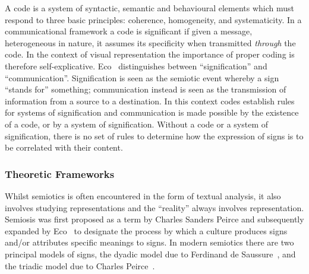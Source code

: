A code is a system of syntactic, semantic and behavioural elements which must respond to three basic principles:  coherence, homogeneity, and systematicity.
In a communicational framework a code is significant if given a message, heterogeneous in nature, it assumes its specificity when transmitted \emph{through} the code.
In the context of visual representation the importance of proper coding is therefore self-explicative.
Eco~\cite{Eco1979} distinguishes between ``signification'' and ``communication''. Signification is seen as the semiotic event whereby a sign ``stands for'' something;  communication instead is seen as the transmission of information from a source to a destination. In this context codes establish rules for systems of signification and communication is made possible by the existence of a code, or by a system of signification. Without a code or a system of signification, there is no set of rules to determine how the expression of signs is to be correlated with their content. 


 

 
    
\subsubsection{Theoretic Frameworks}
Whilst semiotics is often encountered in the form of textual analysis, it also involves
studying representations and the ``reality'' always involves representation.
Semiosis was first proposed as a term by Charles Sanders Peirce and subsequently expanded by Eco~\cite{Eco1979} to designate the process by which a culture produces signs and/or attributes specific meanings to signs. 
In modern semiotics there are two principal models of signs, the dyadic model due to Ferdinand de Saussure~\cite{Saussure1983}, and the triadic model due to Charles Peirce~\cite{Peirce1955}. 

